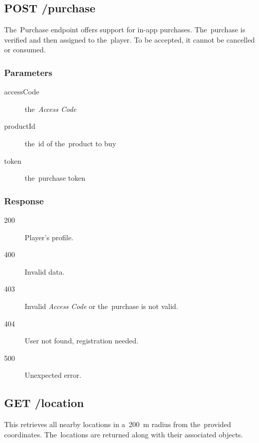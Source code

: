 \subsection{POST /purchase}

The~Purchase endpoint offers support for in-app purchases. The~purchase is verified and then assigned to the~player. To be accepted, it cannot be cancelled or consumed.

\subsubsection*{Parameters}

\begin{description}

	\item[accessCode] the~\textit{Access Code}

	\item[productId] the~id of the~product to buy

	\item[token] the~purchase token

\end{description}

\subsubsection*{Response}

\begin{description}

	\item[200] Player's profile.

	\item[400] Invalid data.

	\item[403] Invalid \textit{Access Code} or the~purchase is not valid.

	\item[404] User not found, registration needed.

	\item[500] Unexpected error.

\end{description}

\subsection{GET /location}

This retrieves all nearby locations in a~200~m radius from the~provided coordinates. The~locations are returned along with their associated objects.

